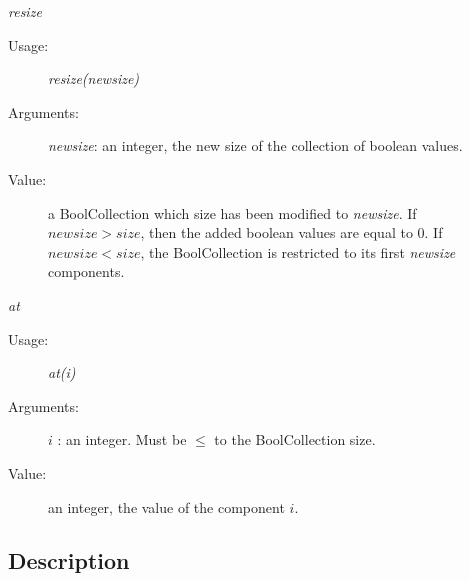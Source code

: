 \begin{description}
\item \textit{resize}
\begin{description}
\item[Usage:] \textit{resize(newsize)}
\item[Arguments:]  \textit{newsize}: an integer, the new size of the  collection of boolean values.
\item[Value:]  a BoolCollection which size has been modified to \textit{newsize}. If $newsize > size$, then the added boolean values are equal to 0. If $newsize < size$, the BoolCollection is restricted to its first \textit{newsize} components.
\end{description}
\bigskip

\item \textit{at}
\begin{description}
\item[Usage:] \textit{at(i)}
\item[Arguments:] $i$ : an integer. Must be $\leq$ to the BoolCollection size.
\item[Value:] an integer, the value of the component $i$.
\end{description}
\bigskip

\end{description}




\newpage
\subsection{Description}

